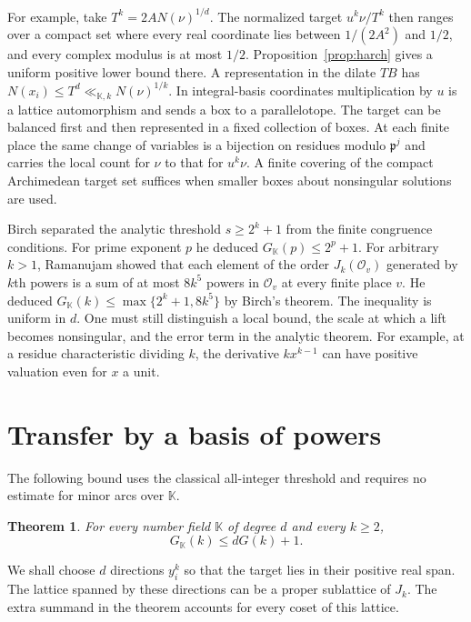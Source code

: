 \documentclass[11pt,letterpaper]{article}
\newtheorem{theorem}{Theorem}[section]
\theoremstyle{definition}
\numberwithin{equation}{section}
\begin{document}
For example, take $T^k=2A N(\nu)^{1/d}$. The normalized target
$u^k\nu/T^k$ then ranges over a compact set where every real coordinate
lies between $1/(2A^2)$ and $1/2$, and every complex modulus is at most
$1/2$. Proposition~\ref{prop:harch} gives a uniform positive lower
bound there. A representation in the dilate $TB$ has
$N(x_i)\le T^d\ll_{\mathbb K,k}N(\nu)^{1/k}$. In integral-basis
coordinates multiplication by $u$ is a lattice automorphism and sends
a box to a parallelotope. The target can be balanced first and then
represented in a fixed collection of boxes. At each finite place the
same change of variables is a bijection on residues modulo
$\mathfrak p^j$ and carries the local count for $\nu$ to that for
$u^k\nu$. A finite covering of the compact Archimedean target set
suffices when smaller boxes about nonsingular solutions are used.

Birch \cite[Theorem~2]{hbirch61} separated the analytic threshold
$s\ge2^k+1$ from the finite congruence conditions. For prime exponent
$p$ he deduced $G_{\mathbb K}(p)\le2^p+1$. For arbitrary $k>1$,
Ramanujam \cite{hram63} showed that each element of the order
$J_k(\mathcal O_v)$ generated by $k$th powers is a sum of at most
$8k^5$ powers in $\mathcal O_v$ at every finite place $v$. He deduced
$G_{\mathbb K}(k)\le\max\{2^k+1,8k^5\}$ by Birch's theorem.
The inequality is uniform in $d$. One must still distinguish a
local bound, the scale at which a lift becomes nonsingular, and
the error term in the analytic theorem. For example, at a residue
characteristic dividing $k$, the derivative $kx^{k-1}$ can have
positive valuation even for $x$ a unit.

\section{Transfer by a basis of powers}\label{sec:powerbasis}
The following bound uses the classical all-integer threshold and requires
no estimate for minor arcs over $\mathbb K$.

\begin{theorem}\label{thm:hpowers}
For every number field $\mathbb K$ of degree $d$ and every $k\ge2$,
\[
                       G_{\mathbb K}(k)\le dG(k)+1 .
\]
\end{theorem}

We shall choose $d$ directions $y_i^k$ so that the target lies in their
positive real span. The lattice spanned by these directions can be a
proper sublattice of $J_k$. The extra summand in the theorem accounts
for every coset of this lattice.
\end{document}
